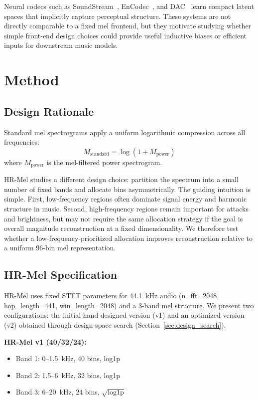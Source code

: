 \documentclass[twocolumn]{article}
\begin{document}
Neural codecs such as SoundStream~\cite{soundstream2021}, EnCodec~\cite{encodec2022}, and DAC~\cite{dac2023} learn compact latent spaces that implicitly capture perceptual structure. These systems are not directly comparable to a fixed mel frontend, but they motivate studying whether simple front-end design choices could provide useful inductive biases or efficient inputs for downstream music models.

\section{Method}

\subsection{Design Rationale}

Standard mel spectrograms apply a uniform logarithmic compression across all frequencies:
\begin{equation}
M_{\text{standard}} = \log(1 + M_{\text{power}})
\end{equation}
where $M_{\text{power}}$ is the mel-filtered power spectrogram.

HR-Mel studies a different design choice: partition the spectrum into a small number of fixed bands and allocate bins asymmetrically. The guiding intuition is simple. First, low-frequency regions often dominate signal energy and harmonic structure in music. Second, high-frequency regions remain important for attacks and brightness, but may not require the same allocation strategy if the goal is overall magnitude reconstruction at a fixed dimensionality. We therefore test whether a low-frequency-prioritized allocation improves reconstruction relative to a uniform 96-bin mel representation.

\subsection{HR-Mel Specification}

HR-Mel uses fixed STFT parameters for 44.1~kHz audio (n\_fft=2048, hop\_length=441, win\_length=2048) and a 3-band mel structure. We present two configurations: the initial hand-designed version (v1) and an optimized version (v2) obtained through design-space search (Section~\ref{sec:design_search}).

\textbf{HR-Mel v1 (40/32/24):}
\begin{itemize}
\item Band 1: 0--1.5~kHz, 40 bins, log1p
\item Band 2: 1.5--6~kHz, 32 bins, log1p
\item Band 3: 6--20~kHz, 24 bins, $\sqrt{\text{log1p}}$
\end{itemize}
\end{document}
